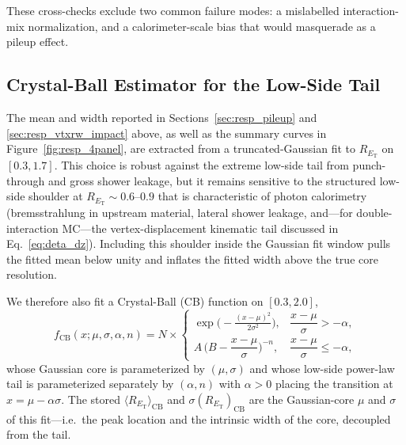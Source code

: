 \documentclass[11pt,letterpaper]{article}
\newcommand{\ET}{\ensuremath{E_{\text{T}}}}
\begin{document}
These cross-checks exclude two common failure modes: a mislabelled
interaction-mix normalization, and a calorimeter-scale bias that would
masquerade as a pileup effect.


\subsection{Crystal-Ball Estimator for the Low-Side Tail}
\label{sec:resp_cb}

The mean and width reported in Sections~\ref{sec:resp_pileup} and
\ref{sec:resp_vtxrw_impact} above, as well as the summary curves in
Figure~\ref{fig:resp_4panel}, are extracted from a truncated-Gaussian fit
to $R_{\ET}$ on $[0.3, 1.7]$. This choice is robust against the extreme
low-side tail from punch-through and gross shower leakage, but it remains
sensitive to the structured low-side shoulder at $R_{\ET}\!\sim\!0.6$--$0.9$
that is characteristic of photon calorimetry (bremsstrahlung in upstream
material, lateral shower leakage, and---for double-interaction MC---the
vertex-displacement kinematic tail discussed in
Eq.~\ref{eq:deta_dz}). Including this shoulder inside the Gaussian fit
window pulls the fitted mean below unity and inflates the fitted width
above the true core resolution.

We therefore also fit a Crystal-Ball (CB) function on $[0.3, 2.0]$,
\begin{equation}
  f_{\text{CB}}(x; \mu, \sigma, \alpha, n) =
    N\times\begin{cases}
      \exp\!\Big(-\tfrac{(x-\mu)^2}{2\sigma^2}\Big),
        & \dfrac{x-\mu}{\sigma} > -\alpha, \\[0.6em]
      A\,\Big(B - \dfrac{x-\mu}{\sigma}\Big)^{-n},
        & \dfrac{x-\mu}{\sigma} \le -\alpha,
    \end{cases}
\end{equation}
whose Gaussian core is parameterized by $(\mu, \sigma)$ and whose
low-side power-law tail is parameterized separately by $(\alpha, n)$ with
$\alpha > 0$ placing the transition at $x = \mu - \alpha\sigma$. The
stored $\langle R_{\ET}\rangle_{\text{CB}}$ and
$\sigma(R_{\ET})_{\text{CB}}$ are the Gaussian-core $\mu$ and $\sigma$ of
this fit---i.e.\ the peak location and the intrinsic width of the core,
decoupled from the tail.
\end{document}
